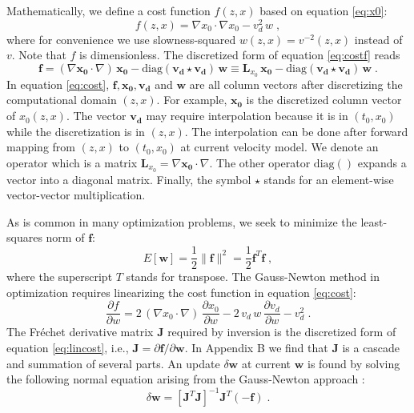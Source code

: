 Mathematically, we define a cost function $f (z,x)$ based on equation \ref{eq:x0}:
\begin{equation}
\label{eq:costf}
f (z,x) = \nabla x_0 \cdot \nabla x_0 - v_d^2\,w\;,
\end{equation}
where for convenience we use slowness-squared $w (z,x) = v^{-2} (z,x)$ instead of $v$. Note that $f$ is 
dimensionless. The discretized form of equation \ref{eq:costf} reads
\begin{equation}
\label{eq:cost}
\mathbf{f} = (\nabla \mathbf{x_0} \cdot \nabla)\,\mathbf{x_0} 
- \mbox{diag}(\mathbf{v_d} \star \mathbf{v_d})\,\mathbf{w} 
\equiv \mathbf{L}_{x_0}\,\mathbf{x_0} 
- \mbox{diag}(\mathbf{v_d} \star \mathbf{v_d})\,\mathbf{w}\;.
\end{equation}
In equation \ref{eq:cost}, $\mathbf{f}, \mathbf{x_0}, \mathbf{v_d}$ and $\mathbf{w}$ are all column vectors after 
discretizing the computational domain $(z,x)$. For example, $\mathbf{x_0}$ is the discretized column vector of 
$x_0 (z,x)$. The vector $\mathbf{v_d}$ may require interpolation because it is in $(t_0,x_0)$ while 
the discretization is in $(z,x)$. The interpolation can be done after forward mapping from $(z,x)$ to $(t_0,x_0)$ 
at current velocity model. We denote an operator which is a matrix 
$\mathbf{L}_{x_0} = \nabla \mathbf{x_0} \cdot \nabla$. The other operator $\mbox{diag}()$ expands a vector 
into a diagonal matrix. Finally, the symbol $\star$ stands for an element-wise vector-vector multiplication.

As is common in many optimization problems, we seek to minimize the least-squares norm of $\mathbf{f}$:
\begin{equation}
\label{eq:objective}
E [\mathbf{w}] = \frac{1}{2} \|\mathbf{f}\|^2 = \frac{1}{2} \mathbf{f}^T \mathbf{f}\;,
\end{equation}
where the superscript $T$ stands for transpose. The Gauss-Newton method in optimization 
requires linearizing the cost function in equation \ref{eq:cost}:
\begin{equation}
\label{eq:lincost}
\frac{\partial f}{\partial w} = 
2\,(\nabla x_0 \cdot \nabla)\,\frac{\partial x_0}{\partial w} -
2\,v_d\,w\,\frac{\partial v_d}{\partial w} - v_d^2\;.
\end{equation}
The Fr\'{e}chet derivative matrix $\mathbf{J}$ required by inversion is the discretized 
form of equation \ref{eq:lincost}, i.e., $\mathbf{J} = \partial \mathbf{f} / \partial \mathbf{w}$. In Appendix 
B we find that $\mathbf{J}$ is a cascade and summation of several parts. An update 
$\delta \mathbf{w}$ at current $\mathbf{w}$ is found by solving the following normal equation arising from 
the Gauss-Newton approach \cite[]{bjorck}:
\begin{equation}
\label{eq:normal}
\delta \mathbf{w} = \left[ \mathbf{J}^T \mathbf{J} \right]^{-1} \mathbf{J}^T (- \mathbf{f})\;.
\end{equation}

